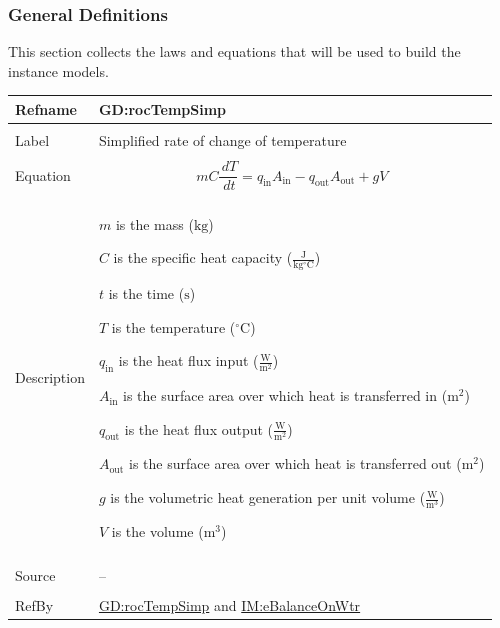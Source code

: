 \documentclass[12pt]{article}
\begin{document}
\subsubsection{General Definitions}
\label{Sec:GDs}
This section collects the laws and equations that will be used to build the instance models.

\vspace{\baselineskip}
\noindent
\begin{minipage}{\textwidth}
\begin{tabular}{>{\raggedright}p{}>{\raggedright\arraybackslash}p{}}
\toprule \textbf{Refname} & \textbf{GD:rocTempSimp}
\label{GD:rocTempSimp}
\\ \midrule \\
Label & Simplified rate of change of temperature
        
\\ \midrule \\
Equation & \begin{displaymath}
           m C \frac{\,dT}{\,dt}={q_{\text{in}}} {A_{\text{in}}}-{q_{\text{out}}} {A_{\text{out}}}+g V
           \end{displaymath}
\\ \midrule \\
Description & \begin{symbDescription}
              \item{$m$ is the mass (${\text{kg}}$)}
              \item{$C$ is the specific heat capacity ($\frac{\text{J}}{\text{kg}{}^{\circ}\text{C}}$)}
              \item{$t$ is the time (${\text{s}}$)}
              \item{$T$ is the temperature (${{}^{\circ}\text{C}}$)}
              \item{${q_{\text{in}}}$ is the heat flux input ($\frac{\text{W}}{\text{m}^{2}}$)}
              \item{${A_{\text{in}}}$ is the surface area over which heat is transferred in (${\text{m}^{2}}$)}
              \item{${q_{\text{out}}}$ is the heat flux output ($\frac{\text{W}}{\text{m}^{2}}$)}
              \item{${A_{\text{out}}}$ is the surface area over which heat is transferred out (${\text{m}^{2}}$)}
              \item{$g$ is the volumetric heat generation per unit volume ($\frac{\text{W}}{\text{m}^{3}}$)}
              \item{$V$ is the volume (${\text{m}^{3}}$)}
              \end{symbDescription}
\\ \midrule \\
Source & --
         
\\ \midrule \\
RefBy & \hyperref[GD:rocTempSimp]{GD:rocTempSimp} and \hyperref[IM:eBalanceOnWtr]{IM:eBalanceOnWtr}
        
\\ \bottomrule
\end{tabular}
\end{minipage}
\end{document}
